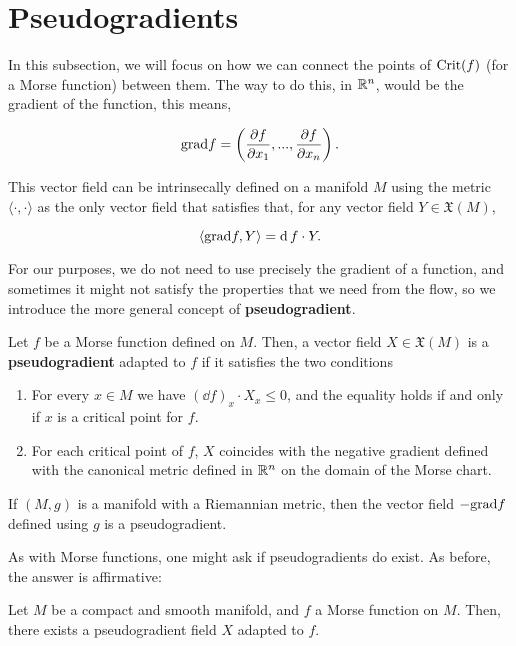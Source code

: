 \section{Pseudogradients}

In this subsection, we will focus on how we can connect the points of $\text{Crit}(f)$ (for a Morse function) between them. The way to do this, in $\mathbb{R}^n$, would be the gradient of the function, this means,

$$\text{grad} f = \left( \frac{\partial f}{\partial x_1},...,\frac{\partial f}{\partial x_n} \right) .$$

This vector field can be intrinsecally defined on a manifold $M$ using the metric $\langle \cdot , \cdot \rangle$ as the only vector field that satisfies that, for any vector field $Y \in \mathfrak{X}(M)$,

$$\langle \text{grad} f, Y \rangle = \operatorname d f \cdot Y .$$

For our purposes, we do not need to use precisely the gradient of a function, and sometimes it might not satisfy the properties that we need from the flow, so we introduce the more general concept of {\bf pseudogradient}.

\begin{deff}
Let $f$ be a Morse function defined on $M$. Then, a vector field $X \in \mathfrak{X}(M)$ is a {\bf pseudogradient} adapted to $f$ if it satisfies the two conditions

\begin{enumerate}
\item For every $x \in M$ we have $(\dd f)_x \cdot X_x \leq 0$, and the equality holds if and only if $x$ is a critical point for $f$.
\item For each critical point of $f$, $X$ coincides with the negative gradient defined with the canonical metric defined in $\mathbb{R}^n$ on the domain of the Morse chart.
\end{enumerate}
\end{deff}

\begin{rmrk}
If $(M,g)$ is a manifold with a Riemannian metric, then the vector field $- \text{grad} f$ defined using $g$ is a pseudogradient.
\end{rmrk}

As with Morse functions, one might ask if pseudogradients do exist. As before, the answer is affirmative:

\begin{prop}
Let $M$ be a compact and smooth manifold, and $f$ a Morse function on $M$. Then, there exists a pseudogradient field $X$ adapted to $f$.
\end{prop}

